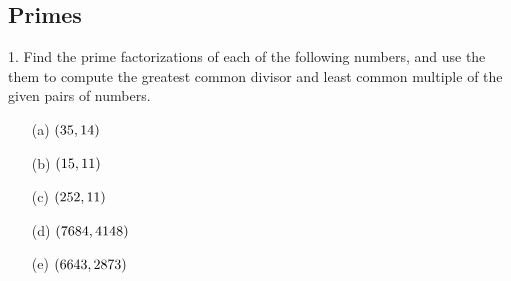 \subsection{Primes}
\begin{mdframed}[style=darkQuesion]
1. Find the prime factorizations of each of the following numbers, and use the 
them to compute the greatest common divisor and least common multiple of the 
given pairs of numbers. 
\begin{multicols}{3}
\begin{itemize}
    \item [(a)] {$\left(35,14\right)$
    }
    \item [(b)] {$\left(15,11\right)$
    }
    \item [(c)] {$\left(252,11\right)$
    }
    \item [(d)] {$\left(7684,4148\right)$
    }
    \item [(e)] {$\left(6643,2873\right)$
    }
\end{itemize}
\end{multicols}
\end{mdframed}

